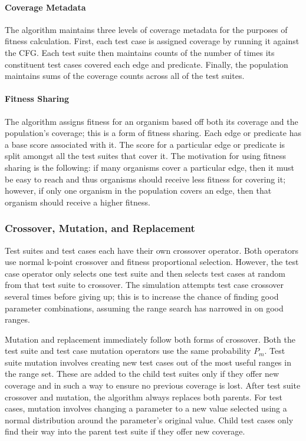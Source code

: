 \documentclass[runningheads]{llncs}
\begin{document}
\paragraph{Coverage Metadata}
The algorithm maintains three levels of coverage metadata for the purposes of fitness calculation. First, each test case is assigned coverage by running it against the CFG. Each test suite then maintains counts of the number of times its constituent test cases covered each edge and predicate. Finally, the population maintains sums of the coverage counts across all of the test suites.

\paragraph{Fitness Sharing}
The algorithm assigns fitness for an organism based off both its coverage and the population's coverage; this is a form of fitness sharing. Each edge or predicate has a base score associated with it. The score for a particular edge or predicate is split amongst all the test suites that cover it. The motivation for using fitness sharing is the following: if many organisms cover a particular edge, then it must be easy to reach and thus organisms should receive less fitness for covering it; however, if only one organism in the population covers an edge, then that organism should receive a higher fitness. 

\subsubsection{Crossover, Mutation, and Replacement}

Test suites and test cases each have their own crossover operator. Both operators use normal k-point crossover and fitness proportional selection. However, the test case operator only selects one test suite and then selects test cases at random from that test suite to crossover. The simulation attempts test case crossover several times before giving up; this is to increase the chance of finding good parameter combinations, assuming the range search has narrowed in on good ranges.

Mutation and replacement immediately follow both forms of crossover. Both the test suite and test case mutation operators use the same probability $P_m$. Test suite mutation involves creating new test cases out of the most useful ranges in the range set. These are added to the child test suites only if they offer new coverage and in such a way to ensure no previous coverage is lost. After test suite crossover and mutation, the algorithm always replaces both parents. For test cases, mutation involves changing a parameter to a new value selected using a normal distribution around the parameter's original value. Child test cases only find their way into the parent test suite if they offer new coverage. 
\end{document}
